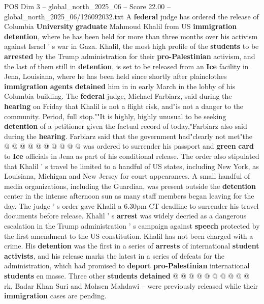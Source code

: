 \begin{textsample}{POS Dim 3 – global\_north\_2025\_06 – Score 22.00 – global\_north\_2025\_06/126092032.txt}  \label{ex:f3_pos_108}
A \textbf{federal} judge has ordered the release of Columbia \textbf{University} \textbf{graduate} Mahmoud Khalil from US \textbf{immigration} \textbf{detention}, where he has been held for more than three months over his activism against Israel ' s war in Gaza.
Khalil, the most high profile of the \textbf{students} to be \textbf{arrested} by the Trump administration for their \textbf{pro-Palestinian} activism, and the last of them still in \textbf{detention}, is set to be released from an \textbf{Ice} facility in Jena, Louisiana, where he has been held since shortly after plainclothes \textbf{immigration} \textbf{agents} \textbf{detained} him in in early March in the lobby of his Columbia building.
The \textbf{federal} judge, Michael Farbiarz, said during the \textbf{hearing} on Friday that Khalil is not a flight risk, and"is not a danger to the community.
Period, full stop.""It is highly, highly unusual to be seeking \textbf{detention} of a petitioner given the factual record of today,"Farbiarz also said during the \textbf{hearing}.
Farbiarz said that the government had"clearly not met"the @ @ @ @ @ @ @ @ @ @ was ordered to surrender his passport and \textbf{green} \textbf{card} to \textbf{Ice} officials in Jena as part of his conditional release.
The order also stipulated that Khalil ' s travel be limited to a handful of US states, including New York, as Louisiana, Michigan and New Jersey for court appearances.
A small handful of media organizations, including the Guardian, was present outside the \textbf{detention} center in the intense afternoon sun as many staff members began leaving for the day.
The judge ' s order gave Khalil a 6.30pm CT deadline to surrender his travel documents before release.
Khalil ' s \textbf{arrest} was widely decried as a dangerous escalation in the Trump administration ' s campaign against \textbf{speech} protected by the first amendment to the US constitution.
Khalil has not been charged with a crime.
His \textbf{detention} was the first in a series of \textbf{arrests} of international \textbf{student} \textbf{activists}, and his release marks the latest in a series of defeats for the administration, which had promised to \textbf{deport} \textbf{pro-Palestinian} international \textbf{students} en masse.
Three other \textbf{students} \textbf{detained} @ @ @ @ @ @ @ @ @ @ rk, Badar Khan Suri and Mohsen Mahdawi -- were previously released while their \textbf{immigration} cases are pending.

\end{textsample}
